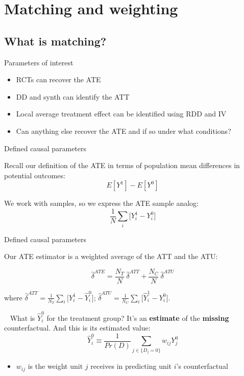 \documentclass{beamer}
\begin{document}



\section{Matching and weighting}


\subsection{What is matching?}

\begin{frame}{Parameters of interest}

\begin{itemize}
	\item RCTs can recover the ATE
	\item DD and synth can identify the ATT
	\item Local average treatment effect can be identified using RDD and IV
	\item Can anything else recover the ATE and if so under what conditions?
\end{itemize}

\end{frame}



\begin{frame}{Defined causal parameters}

Recall our definition of the ATE in terms of population mean differences in potential outcomes: $$E[Y^1] - E[Y^0]$$

We work with samples, so we express the ATE sample analog: $$\frac{1}{N} \sum_i \bigg [ Y_i^1 - Y_i^0 \bigg ]$$


\end{frame}

\begin{frame}{Defined causal parameters}

Our ATE estimator is a weighted average of the ATT and the ATU:

$$\widehat{\delta}^{ATE} = \frac{N_T}{N}\  \widehat{\delta}^{ATT} + \frac{N_C}{N}\  \widehat{\delta}^{ATU}$$


where $\widehat{\delta}^{ATT} = \frac{1}{N_T} \sum_i \bigg [Y_i^1 - \widehat{Y}_i^0 \bigg ]$;
$\widehat{\delta}^{ATU} = \frac{1}{N_C} \sum_i \bigg [\widehat{Y}_i^1 - Y_i^0 \bigg ]$.


\pause\bigskip~\bigskip
What is $\widehat{Y}^0_i$ for the treatment group?  It's an \textbf{estimate} of the \textbf{missing} counterfactual.  And this is its estimated value: 
$$\widehat{Y}^0_i \equiv \frac{1}{Pr(D)} \sum_{j \in \{D_j=0\}}w_{ij}Y_j^0$$

\begin{itemize}
  \item $w_{ij}$ is the weight unit $j$ receives in predicting unit $i$'s counterfactual
\end{itemize}

\end{frame}
\end{document}
